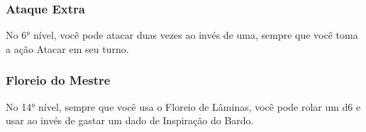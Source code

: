 \documentclass{RPG_Adventure}[2021/10/20]
\begin{document}
\begin{multicols}{2}
\subsubsection{Ataque Extra}%

No 6° nível, você pode atacar duas vezes ao invés de uma, sempre que você toma a
ação Atacar em seu turno.

\subsubsection{Floreio do Mestre}%

No 14° nível, sempre que você usa o Floreio de Lâminas, você pode rolar um d6 e
usar ao invés de gastar um dado de Inspiração do Bardo.
\end{multicols}

\end{document}
